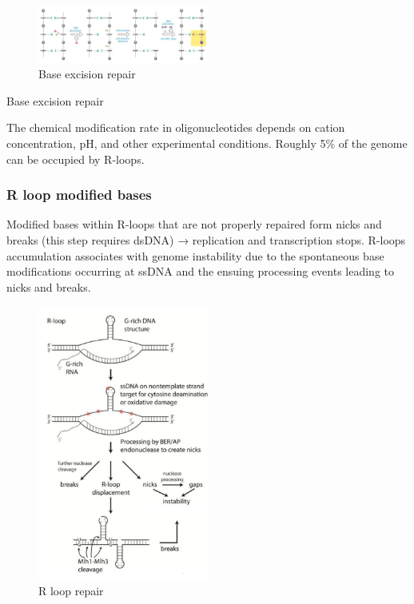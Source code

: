 \begin{figure}
\centering
\includegraphics[width=0.5\textwidth]{../_resources/Screen_Shot_2022-11-30_at_08-49-05.png}
\caption{Base excision repair}
\end{figure}

Base excision repair

The chemical modification rate in oligonucleotides depends on cation concentration, pH, and other experimental conditions. Roughly 5\% of the genome can be occupied by R-loops.

\hypertarget{r-loop-modified-bases}{%
\subsubsection{R loop modified bases}\label{r-loop-modified-bases}}

Modified bases within R-loops that are not properly repaired form nicks and breaks (this step requires dsDNA) → replication and transcription stops. R-loops accumulation associates with genome instability due to the spontaneous base modifications occurring at ssDNA and the ensuing processing events leading to nicks and breaks.

\begin{figure}
\centering
\includegraphics[width=0.5\textwidth]{../_resources/Screen_Shot_2022-11-30_at_08-51-07.png}
\caption{R loop repair}
\end{figure}


